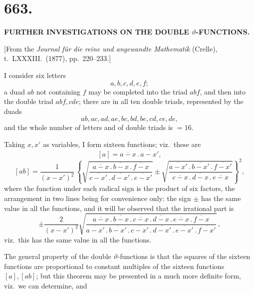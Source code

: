 \documentclass[11pt,a4paper]{article}
\begin{document}

\section*{663.}

\begin{center}
\textbf{FURTHER INVESTIGATIONS ON THE DOUBLE $\vartheta$-FUNCTIONS.}
\end{center}

\medskip

\begin{center}
[From the \emph{Journal f\"ur die reine und angewandte Mathematik} (Crelle), t.~LXXXIII.\ (1877), pp.~220--233.]
\end{center}

\medskip

\noindent I consider six letters
\[
a, b, c, d, e, f;
\]
a duad $ab$ not containing $f$ may be completed into the triad $abf$, and then into the double triad $abf, cde$; there are in all ten double triads, represented by the duads
\[
ab, ac, ad, ae, bc, bd, be, cd, ce, de,
\]
and the whole number of letters and of double triads is $= 16$.

\medskip

Taking $x, x'$ as variables, I form sixteen functions; viz.\ these are
\[
[a] = \overline{a - x}\,.\,\overline{a - x'},
\]
\[
[ab] = \frac{1}{(x - x')^{2}}\,\left\{\sqrt{\frac{\overline{a - x}\,.\,\overline{b - x}\,.\,\overline{f - x}}{\overline{c - x'}\,.\,\overline{d - x'}\,.\,\overline{e - x'}}} \pm \sqrt{\frac{\overline{a - x'}\,.\,\overline{b - x'}\,.\,\overline{f - x'}}{\overline{c - x}\,.\,\overline{d - x}\,.\,\overline{e - x}}}\right\}^{2},
\]
where the function under each radical sign is the product of six factors, the arrangement in two lines being for convenience only: the sign $\pm$ has the same value in all the functions, and it will be observed that the irrational part is
\[
\pm\frac{2}{(x - x')^{2}}\sqrt{\frac{\overline{a - x}\,.\,\overline{b - x}\,.\,\overline{c - x}\,.\,\overline{d - x}\,.\,\overline{e - x}\,.\,\overline{f - x}}{\overline{a - x'}\,.\,\overline{b - x'}\,.\,\overline{c - x'}\,.\,\overline{d - x'}\,.\,\overline{e - x'}\,.\,\overline{f - x'}}}\,,
\]
viz.\ this has the same value in all the functions.

\medskip

The general property of the double $\vartheta$-functions is that the squares of the sixteen functions are proportional to constant multiples of the sixteen functions $[a], [ab]$; but this theorem may be presented in a much more definite form, viz.\ we can determine, and
\end{document}

